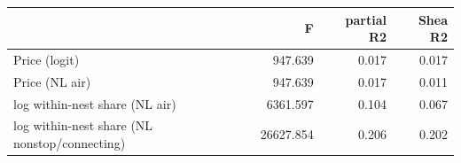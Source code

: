 \begin{tabular}{lrrr}
\toprule
 & F & partial R2 & Shea R2 \\
\midrule
Price (logit) & 947.639 & 0.017 & 0.017 \\
Price (NL air) & 947.639 & 0.017 & 0.011 \\
log within-nest share (NL air) & 6361.597 & 0.104 & 0.067 \\
log within-nest share (NL nonstop/connecting) & 26627.854 & 0.206 & 0.202 \\
\bottomrule
\end{tabular}
\par\vspace{2pt}{\footnotesize Route-clustered first-stage Wald F statistics of the excluded instruments, partial $R^2$ and Shea's partial $R^2$ (which accounts for multiple endogenous regressors). Baseline instruments; route, quarter and carrier fixed effects.}
